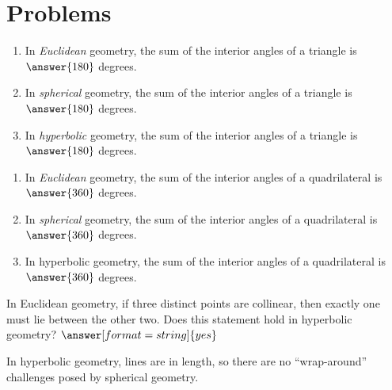 \documentclass{ximera}
\begin{document}
\section*{Problems}

\begin{problem}
\begin{enumerate}
\item In \emph{Euclidean} geometry, the sum of the interior angles of a triangle is 
$\answer{180}$ degrees.
\item In \emph{spherical} geometry, the sum of the interior angles of a triangle is 
$\answer{180}$ degrees.
\item In \emph{hyperbolic} geometry, the sum of the interior angles of a triangle is 
$\answer{180}$ degrees.
\end{enumerate}
\end{problem}

\begin{problem}
\begin{enumerate}
\item In \emph{Euclidean} geometry, the sum of the interior angles of a quadrilateral is 
$\answer{360}$ degrees.
\item In \emph{spherical} geometry, the sum of the interior angles of a quadrilateral is 
$\answer{360}$ degrees.
\item In hyperbolic geometry, the sum of the interior angles of a quadrilateral is 
$\answer{360}$ degrees.
\end{enumerate}
\end{problem}

\begin{problem} %
In Euclidean geometry, if three distinct points are collinear, then exactly one must lie between the other two.  Does this statement hold in hyperbolic geometry? 
$\answer[format=string]{yes}$
\begin{feedback}[correct]
In hyperbolic geometry, lines are  in length, so there are no ``wrap-around'' challenges posed by spherical geometry.  
\end{feedback}
\end{problem}
\end{document}
